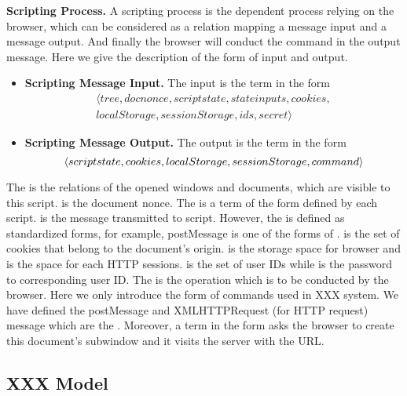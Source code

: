 \noindent\textbf{Scripting Process.}
A scripting process is the dependent process relying on the browser, which can be considered as a relation  mapping a message input and a message output. And finally the browser will conduct the command in the output message. Here we give the description of the form of input and output.
\vspace{-2mm}
\begin{itemize}
\item \textbf{Scripting Message Input. } The input is the term in the form
\vspace{-3mm}
\begin{multline*}
\langle tree, docnonce, scriptstate, stateinputs,cookies,\\
localStorage, sessionStorage, ids, secret \rangle
\end{multline*}
\item \textbf{Scripting Message Output. }The output is the term in the form
\begin{equation*}
\setlength{\abovedisplayskip}{3pt}
\setlength{\belowdisplayskip}{1pt}
\langle scriptstate, cookies, localStorage,sessionStorage, command \rangle
\end{equation*}
\end{itemize}
\vspace{-2mm}
The  is the relations of the opened windows and documents, which are visible to this script.  is the document nonce. The   is a term of the form defined by each script.  is the message transmitted to script. However, the  is defined as standardized forms, for example, postMessage is one of the forms of .  is the set of cookies that belong to the document's origin.  is the storage space for browser and  is the space for each HTTP sessions.   is the set of user IDs while  is the password to corresponding user ID. The  is the operation which is to be conducted by the browser. Here we only introduce the form of commands used in XXX system. We have defined the postMessage and XMLHTTPRequest (for HTTP request) message which are the . Moreover, a term in the form  asks the browser to create this document's subwindow and it visits the server with the URL.

\subsection{XXX Model}


